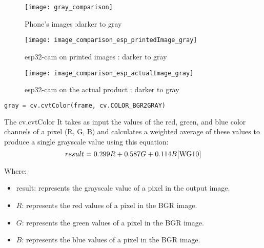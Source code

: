 \FloatBarrier
\begin{figure}[h]
\FloatBarrier
         \centering
        \texttt{[image: gray\_comparison]}
   
        \caption{Phone's images :darker to gray}
        \label{fig:Phone's images : darker to gray}
\FloatBarrier
    \end{figure}


\FloatBarrier
\FloatBarrier
\begin{figure}[h]
\FloatBarrier
         \centering
        \texttt{[image: image\_comparison\_esp\_printedImage\_gray]}
   
        \caption{esp32-cam on printed images : darker to gray}
        \label{fig:esp32-cam on printed images :  darker to gray}
\FloatBarrier
    \end{figure}


\FloatBarrier
\FloatBarrier
\begin{figure}[h]
\FloatBarrier
         \centering
        \texttt{[image: image\_comparison\_esp\_actualImage\_gray]}
   
        \caption{esp32-cam on the actual product : darker to gray}
        \label{fig:Phone's images :  darker to gray}
\FloatBarrier
    \end{figure}


\FloatBarrier 
\begin{lstlisting}[language=Python]
 gray = cv.cvtColor(frame, cv.COLOR_BGR2GRAY)
\end{lstlisting}
The cv.cvtColor It takes as input the values of the red, green, and blue color channels of a pixel (R, G, B) and calculates a weighted average of these values to produce a single grayscale value using this equation:\cite{WG10}
\begin{equation}
result = 0.299 R + 0.587 G + 0.114 B \cite{WG10}
\end{equation}

Where:

\begin{itemize}
\item result: represents the grayscale value of a pixel in the output image.
\item $R$: represents the red values of a pixel in the BGR image.
\item $G$: represents the green values of a pixel in the BGR image.
\item $B$: represents the blue values of a pixel in the BGR image.
\end{itemize}

